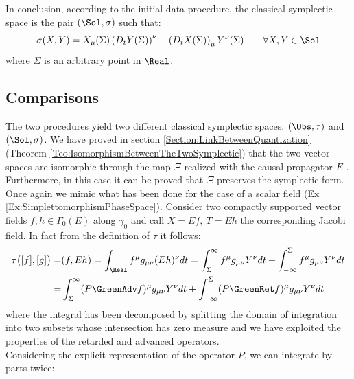 \documentclass[Main]{subfiles}
\begin{document}
				\vspace{3.5mm}
				In conclusion, according to the initial data procedure,  the classical symplectic space is the pair $(\Sol, \sigma)$ such that:
				\begin{displaymath}
					\sigma( X, Y) = X_\mu(\Sigma) \left( D_t Y (\Sigma)\right)^\nu - \left(D_t X(\Sigma)\right)_\mu Y^\nu(\Sigma) \qquad \forall X,Y \in \Sol
				\end{displaymath}
				where $\Sigma$ is an arbitrary point in $\Real$.

	\subsection{Comparisons}
		The two procedures yield two different classical symplectic spaces: $(\Obs,\tau)$ and $(\Sol, \sigma)$.
		We have proved in section \ref{Section:LinkBetweenQuantization} (Theorem \ref{Teo:IsomorphismBetweenTheTwoSymplectic}) that the two vector spaces are isomorphic through the map $\Xi$ realized with the causal propagator $E$ .
		Furthermore, in this case it can be proved that $\Xi$ preserves the symplectic form.
		\\
		Once again we mimic what has been done for the case of a scalar field (Ex \ref{Ex:SimplettomorphismPhaseSpace}).
		Consider two compactly supported vector fields $f,h \in \Gamma_0(E)$ along $\gamma_0$	and call $X= Ef,\: T = Eh$ the corresponding Jacobi field.
		In fact from the definition of $\tau$ it follows:
		\begin{align}
			\tau\big( [f], [g] \big) =& (f, Eh) = \int_\Real f^\mu g_{\mu \nu} ( E h)^\nu dt =
					\int_\Sigma^\infty  f^\mu g_{\mu \nu} Y^\nu dt	 + 
					\int_{-\infty}^\Sigma  f^\mu g_{\mu \nu} Y^\nu dt
			\nonumber \\
			=& \int_\Sigma^\infty (P \GreenAdv f)^\mu g_{\mu \nu} Y^\nu dt	 + 
					\int_{-\infty}^\Sigma (P \GreenRet f)^\mu g_{\mu \nu} Y^\nu dt
		\end{align}
		where the integral has been decomposed by splitting the domain of integration into two subsets whose intersection has zero measure and we have exploited the properties of the retarded and advanced operators.\\
		Considering the explicit representation of the operator $P$, we can integrate by parts twice:
\end{document}
